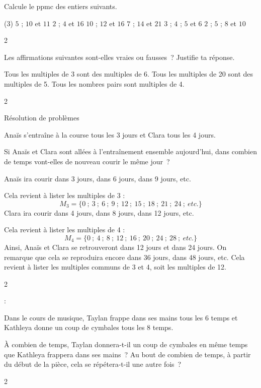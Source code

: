 \documentclass[a4paper,12pt]{report}
\begin{document}
\vfill

\begin{exo}{
    Calcule le ppmc des entiers suivants.


\begin{tasks}[after-item-skip = 0.5em](3)
    \task $5$ ; $10$ et $11$
    \task $2$ ; $4$ et $16$
    \task $10$ ; $12$  et $16$
    \task $7$ ; $14$ et $21$
    \task $3$ ; $4$ ; $5$ et $6$
    \task $2$ ; $5$ ; $8$ et $10$
\end{tasks}
}{2}\end{exo}



\vfill

\newpage

\begin{exo}{
    Les affirmations suivantes sont-elles vraies ou fausses~? Justifie ta réponse.
\begin{tasks}[after-item-skip = 0.5em]
    \task Tous les multiples de 3 sont des multiples de 6.
    \task Tous les multiples de 20 sont des multiples de 5.
    \task Tous les nombres pairs sont multiples de 4.
\end{tasks}
}{2}\end{exo}


\begin{resolu}{Résolution de problèmes}{

    Anaïs s'entraîne à la course tous les 3 jours et Clara tous les 4 jours. 

    Si Anaïs et Clara sont allées à l'entraînement ensemble aujourd'hui, dans combien de temps vont-elles de nouveau courir le même jour~? 

    {\color{blue}
        Anaïs ira courir dans 3 jours, dans 6 jours, dans 9 jours, etc. 

	Cela revient à lister les multiples de 3 : 
	\[M_3=\{0~;~3~;~6~;~9~;~12~;~15~;~18~;~21~;~24~;~etc.\}\]
        Clara ira courir dans 4 jours, dans 8 jours, dans 12 jours, etc. 

	Cela revient à lister les multiples de 4 :
	\[M_4=\{0~;~4~;~8~;~12~;~16~;~20~;~24~;~28~;~etc.\}\] 
        Ainsi, Anaïs et Clara se retrouveront dans 12 jours et dans 24 jours. On remarque que cela se reproduira encore dans 36 jours, dans 48 jours, etc. Cela revient à lister les multiples communs de 3 et 4, soit les multiples de 12. 
    }
}{2}\end{resolu}


\newpage
:
\begin{exo}{
    Dans le cours de musique, Taylan frappe dans ses mains tous les 6 temps et Kathleya donne un coup de cymbales tous les 8 temps.
    \begin{tasks}[after-item-skip = 0.2em, after-skip=-0.5em, before-skip=-0.5em]
        \task À combien de temps, Taylan donnera-t-il un coup de cymbales en même temps que Kathleya frappera dans ses mains~?
        \task Au bout de combien de temps, à partir du début de la pièce, cela se répétera-t-il une autre fois~?
    \end{tasks}
}{2}\end{exo}
\end{document}
